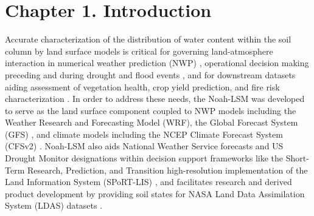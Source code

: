 
\chapter{Chapter 1. Introduction}%

Accurate characterization of the distribution of water content within the soil column by land surface models is critical for governing land-atmosphere interaction in numerical weather prediction (NWP) \citep{brocca_spatial-temporal_2010} \citep{koster_contribution_2010}, operational decision making preceding and during drought and flood events \citep{otkin_assessing_2016}, and for downstream datasets aiding assessment of vegetation health, crop yield prediction, and fire risk characterization \citep{case_role_2023}. In order to address these needs, the Noah-LSM was developed to serve as the land surface component coupled to NWP models including the Weather Research and Forecasting Model (WRF), the Global Forecast System (GFS) \citep{jin_sensitivity_2010} \citep{mitchell_ncep_2005}, and climate models including the NCEP Climate Forecast System (CFSv2) \citep{saha_ncep_2014}. Noah-LSM also aids National Weather Service forecasts and US Drought Monitor designations within decision support frameworks like the Short-Term Research, Prediction, and Transition high-resolution implementation of the Land Information System (SPoRT-LIS) \citep{case_nasa_2022} \citep{case_assessment_2014}, and facilitates research and derived product development by providing soil states for NASA Land Data Assimilation System (LDAS) datasets \citep{ek_implementation_2003}.

